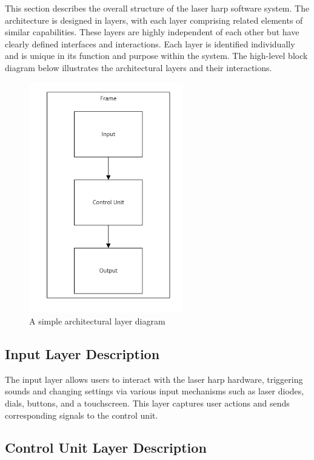 This section describes the overall structure of the laser harp software system. The architecture is designed in layers, with each layer comprising related elements of similar capabilities. These layers are highly independent of each other but have clearly defined interfaces and interactions. Each layer is identified individually and is unique in its function and purpose within the system. The high-level block diagram below illustrates the architectural layers and their interactions.

\begin{figure}[h!]
\centering
\includegraphics[width=0.60\textwidth]{images/Layers}
\caption{A simple architectural layer diagram}
\end{figure}

\subsection{Input Layer Description}

The input layer allows users to interact with the laser harp hardware, triggering sounds and changing settings via various input mechanisms such as laser diodes, dials, buttons, and a touchscreen. This layer captures user actions and sends corresponding signals to the control unit.

\subsection{Control Unit Layer Description}

